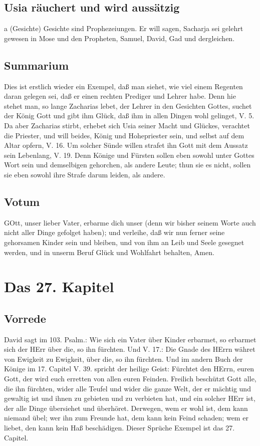 \section[Usia räuchert und wird aussätzig]{Usia räuchert und wird aussätzig}

a (Gesichte) Gesichte sind Prophezeiungen. Er will sagen, Sacharja sei gelehrt gewesen in Mose und den Propheten, Samuel, David, Gad und dergleichen.

\section{Summarium}

Dies ist erstlich wieder ein Exempel, daß man siehet, wie viel einem Regenten daran gelegen sei, daß er einen rechten Prediger und Lehrer habe. Denn hie stehet man, so lange Zacharias lebet, der Lehrer in den Gesichten Gottes, suchet der König Gott und gibt ihm Glück, daß ihm in allen Dingen wohl gelinget, V. 5. Da aber Zacharias stirbt, erhebet sich Usia seiner Macht und Glückes, verachtet die Priester, und will beides, König und Hohepriester sein, und selbst auf dem Altar opfern, V. 16. Um solcher Sünde willen strafet ihn Gott mit dem Aussatz sein Lebenlang, V. 19. Denn Könige und Fürsten sollen eben sowohl unter Gottes Wort sein und demselbigen gehorchen, als andere Leute; thun sie es nicht, sollen sie eben sowohl ihre Strafe darum leiden, als andere.

\section{Votum}

GOtt, unser lieber Vater, erbarme dich unser (denn wir bisher seinem Worte auch nicht aller Dinge gefolget haben); und verleihe, daß wir nun ferner seine gehorsamen Kinder sein und bleiben, und von ihm an Leib und Seele gesegnet werden, und in unserm Beruf Glück und Wohlfahrt behalten, Amen.

\chapter{Das 27. Kapitel}

\section{Vorrede}

David sagt im 103. Psalm.: Wie sich ein Vater über Kinder erbarmet, so erbarmet sich der HErr über die, so ihn fürchten. Und V. 17.: Die Gnade des HErrn währet von Ewigkeit zu Ewigkeit, über die, so ihn fürchten. Und im andern Buch der Könige im 17. Capitel V. 39. spricht der heilige Geist: Fürchtet den HErrn, euren Gott, der wird euch erretten von allen euren Feinden. Freilich beschützt Gott alle, die ihn fürchten, wider alle Teufel und wider die ganze Welt, der er mächtig und gewaltig ist und ihnen zu gebieten und zu verbieten hat, und ein solcher HErr ist, der alle Dinge übersiehet und überhöret. Derwegen, wem er wohl ist, dem kann niemand übel; wer ihn zum Freunde hat, dem kann kein Feind schaden; wem er liebet, den kann kein Haß beschädigen. Dieser Sprüche Exempel ist das 27. Capitel.

